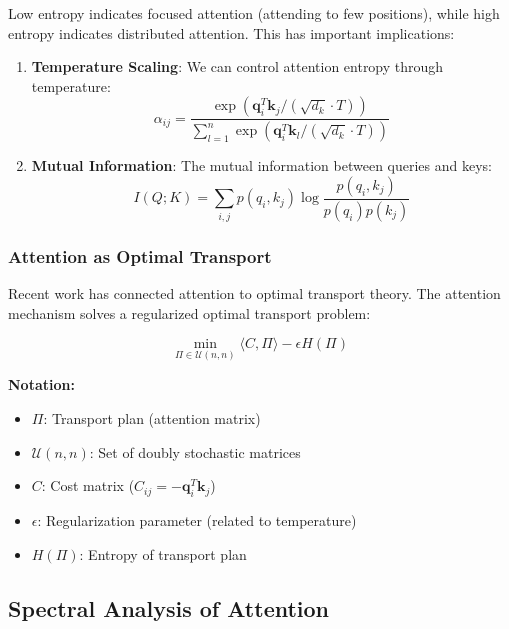 \documentclass[11pt]{article}
\begin{document}
Low entropy indicates focused attention (attending to few positions), while high entropy indicates distributed attention. This has important implications:

\begin{enumerate}
    \item \textbf{Temperature Scaling}: We can control attention entropy through temperature:
    \begin{equation}
    \alpha_{ij} = \frac{\exp(\mathbf{q}_i^T \mathbf{k}_j / (\sqrt{d_k} \cdot T))}{\sum_{l=1}^{n} \exp(\mathbf{q}_i^T \mathbf{k}_l / (\sqrt{d_k} \cdot T))}
    \end{equation}
    
    \item \textbf{Mutual Information}: The mutual information between queries and keys:
    \begin{equation}
    I(Q; K) = \sum_{i,j} p(q_i, k_j) \log \frac{p(q_i, k_j)}{p(q_i)p(k_j)}
    \end{equation}
\end{enumerate}

\subsubsection{Attention as Optimal Transport}

Recent work has connected attention to optimal transport theory. The attention mechanism solves a regularized optimal transport problem:

\begin{equation}
\min_{\Pi \in \mathcal{U}(n,n)} \langle C, \Pi \rangle - \epsilon H(\Pi)
\end{equation}

\begin{notationbox}
\textbf{Notation:}
\begin{itemize}
    \item $\Pi$: Transport plan (attention matrix)
    \item $\mathcal{U}(n,n)$: Set of doubly stochastic matrices
    \item $C$: Cost matrix ($C_{ij} = -\mathbf{q}_i^T \mathbf{k}_j$)
    \item $\epsilon$: Regularization parameter (related to temperature)
    \item $H(\Pi)$: Entropy of transport plan
\end{itemize}
\end{notationbox}

\subsection{Spectral Analysis of Attention}
\end{document}
